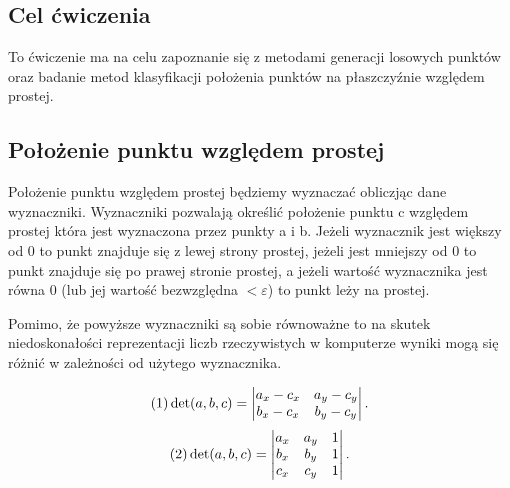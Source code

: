 \subsection{Cel ćwiczenia}
\quad To ćwiczenie ma na celu zapoznanie się z metodami generacji 
losowych punktów oraz badanie metod klasyfikacji położenia punktów na płaszczyźnie 
względem prostej. 
\subsection{Położenie punktu względem prostej}

\quad Położenie punktu względem prostej będziemy wyznaczać obliczjąc
dane wyznaczniki. Wyznaczniki pozwalają określić położenie
punktu c względem prostej która jest wyznaczona przez punkty a i b.
Jeżeli wyznacznik jest większy od 0 to punkt znajduje się z lewej strony prostej, jeżeli jest mniejszy
od 0  to
punkt znajduje się po prawej stronie prostej, a jeżeli wartość wyznacznika
jest równa 0 (lub jej wartość bezwzględna $< \varepsilon$) to punkt leży na prostej.

\quad Pomimo, że
powyższe wyznaczniki są sobie równoważne to na skutek
niedoskonałości reprezentacji liczb rzeczywistych w komputerze wyniki
mogą się różnić w zależności od użytego wyznacznika.

$$
(1)\det(a, b, c)= \begin{vmatrix}
       a_{x} - c_{x} & a_{y} - c_{y} \\
       b_{x} - c_{x} & b_{y} - c_{y} 
              \end{vmatrix}.\\
              $$
              $$
(2)\det(a, b, c) = \begin{vmatrix}
    a_x & a_y & 1\\
    b_x & b_y & 1\\
    c_x & c_y & 1
\end{vmatrix}.\\
$$